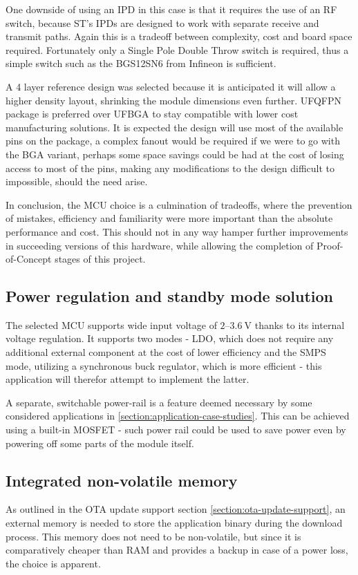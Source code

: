 One downside of using an IPD in this case is that it requires the use of an RF switch, because ST's IPDs are designed to work with separate receive and transmit paths. Again this is a tradeoff between complexity, cost and board space required. Fortunately only a Single Pole Double Throw switch is required, thus a simple switch such as the BGS12SN6 from Infineon \cite{infineon_technologies_bgs12sn6_2024} is sufficient.

A 4 layer reference design was selected because it is anticipated it will allow a higher density layout, shrinking the module dimensions even further. UFQFPN package is preferred over UFBGA to stay compatible with lower cost manufacturing solutions. It is expected the design will use most of the available pins on the package, a complex fanout would be required if we were to go with the BGA variant, perhaps some space savings could be had at the cost of losing access to most of the pins, making any modifications to the design difficult to impossible, should the need arise.

In conclusion, the MCU choice is a culmination of tradeoffs, where the prevention of mistakes, efficiency and familiarity were more important than the absolute performance and cost. This should not in any way hamper further improvements in succeeding versions of this hardware, while allowing the completion of Proof-of-Concept stages of this project. 

\subsection{Power regulation and standby mode solution}
The selected MCU supports wide input voltage of $2\text{--}3.6~\mathrm{V}$ thanks to its internal voltage regulation. It supports two modes - LDO, which does not require any additional external component at the cost of lower efficiency and the SMPS mode, utilizing a synchronous buck regulator, which is more efficient - this application will therefor attempt to implement the latter.

A separate, switchable power-rail is a feature deemed necessary by some considered applications in \ref{section:application-case-studies}. This can be achieved using a built-in MOSFET - such power rail could be used to save power even by powering off some parts of the module itself.

\subsection{Integrated non-volatile memory}
As outlined in the OTA update support section \ref{section:ota-update-support}, an external memory is needed to store the application binary during the download process. This memory does not need to be non-volatile, but since it is comparatively cheaper than RAM and provides a backup in case of a power loss, the choice is apparent.


